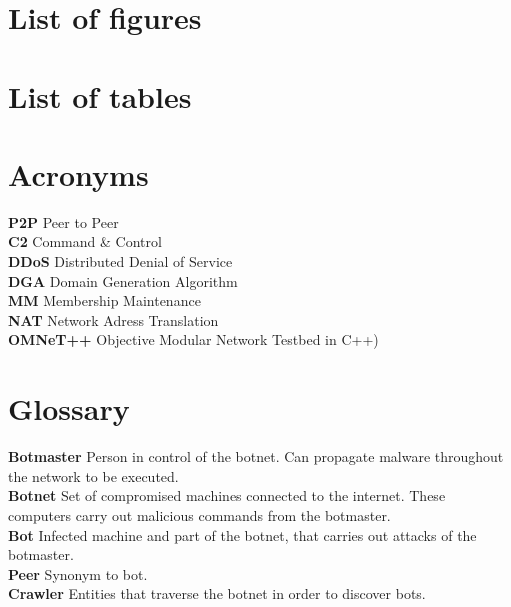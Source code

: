 \documentclass{article}
\begin{document}
\section*{List of figures}

\section*{List of tables}

\section*{Acronyms}
\textbf{P2P} Peer to Peer \\

\textbf{C2} Command \& Control \\

\textbf{DDoS} Distributed Denial of Service \\

\textbf{DGA} Domain Generation Algorithm \\

\textbf{MM} Membership Maintenance \\

\textbf{NAT} Network Adress Translation \\

\textbf{OMNeT++}  Objective Modular Network Testbed in C++) \\

\section*{Glossary}
\textbf{Botmaster} Person in control of the botnet. Can propagate malware throughout the network to be executed. \\

\textbf{Botnet} Set of compromised machines connected to the internet. These computers carry out malicious commands from the botmaster. \\

\textbf{Bot} Infected machine and part of the botnet, that carries out attacks of the botmaster. \\

\textbf{Peer} Synonym to bot. \\

\textbf{Crawler} Entities that traverse the botnet in order to discover bots.\\
\end{document}
